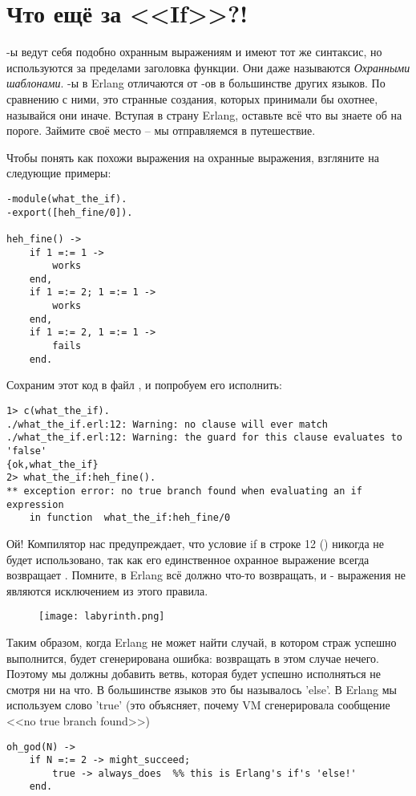 \section{Что ещё за <<If>>?!}
\--ы ведут себя подобно охранным выражениям и имеют тот же синтаксис, но используются за пределами заголовка функции. Они даже называются \emph{Охранными шаблонами}. \--ы в Erlang отличаются от \--ов в большинстве других языков. По сравнению с ними, это странные создания, которых принимали бы охотнее, называйся они иначе. Вступая в страну Erlang, оставьте всё что вы знаете об  на пороге. Займите своё место \--- мы отправляемся в путешествие.

Чтобы понять как похожи выражения  на охранные выражения, взгляните на следующие примеры:
\begin{lstlisting}[style=erlang]
-module(what_the_if).
-export([heh_fine/0]).
 
heh_fine() ->
    if 1 =:= 1 ->
        works
    end,
    if 1 =:= 2; 1 =:= 1 ->
        works
    end,
    if 1 =:= 2, 1 =:= 1 ->
        fails
    end.
\end{lstlisting}
Сохраним этот код в файл , и попробуем его исполнить:
\begin{lstlisting}[style=repl]
1> c(what_the_if).
./what_the_if.erl:12: Warning: no clause will ever match
./what_the_if.erl:12: Warning: the guard for this clause evaluates to 'false'
{ok,what_the_if}
2> what_the_if:heh_fine().
** exception error: no true branch found when evaluating an if expression
    in function  what_the_if:heh_fine/0
\end{lstlisting}
Ой! Компилятор нас предупреждает, что условие if в строке 12 () никогда не будет использовано, так как его единственное охранное выражение всегда возвращает . Помните, в Erlang всё должно что\--то возвращать, и \-- выражения не являются исключением из этого правила. 
\begin{figure}[h!]
    \texttt{[image: labyrinth.png]}
\end{figure}
Таким образом, когда Erlang не может найти случай, в котором страж успешно выполнится, будет сгенерирована ошибка: возвращать в этом случае нечего. Поэтому мы должны добавить ветвь, которая будет успешно исполняться не смотря ни на что. В большинстве языков это бы называлось 'else'. В Erlang мы используем слово 'true' (это объясняет, почему VM сгенерировала сообщение <<no true branch found>>)
\begin{lstlisting}[style=erlang]
oh_god(N) ->
    if N =:= 2 -> might_succeed;
        true -> always_does  %% this is Erlang's if's 'else!'
    end.
\end{lstlisting}

